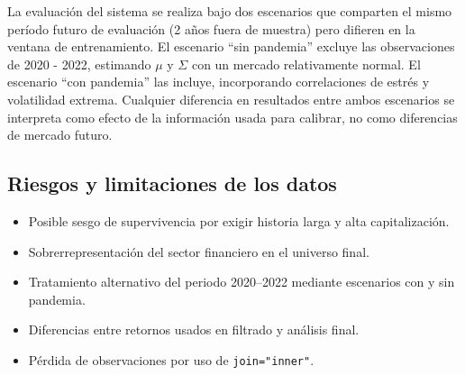 La evaluaci\'on del sistema se realiza bajo dos escenarios que comparten el
mismo per\'iodo futuro de evaluaci\'on (2 a\~nos fuera de muestra) pero
difieren en la ventana de entrenamiento. El escenario ``sin pandemia'' excluye
las observaciones de 2020 - 2022, estimando $\mu$ y $\Sigma$ con un mercado
relativamente normal. El escenario ``con pandemia'' las incluye, incorporando
correlaciones de estr\'es y volatilidad extrema. Cualquier diferencia en
resultados entre ambos escenarios se interpreta como efecto de la
informaci\'on usada para calibrar, no como diferencias de mercado futuro.

\subsection{Riesgos y limitaciones de los datos}

\begin{itemize}
    \item Posible sesgo de supervivencia por exigir historia larga y alta capitalización.
    \item Sobrerrepresentación del sector financiero en el universo final.
    \item Tratamiento alternativo del periodo 2020--2022 mediante escenarios con y sin pandemia.
    \item Diferencias entre retornos usados en filtrado y análisis final.
    \item Pérdida de observaciones por uso de \texttt{join="inner"}.
\end{itemize}
